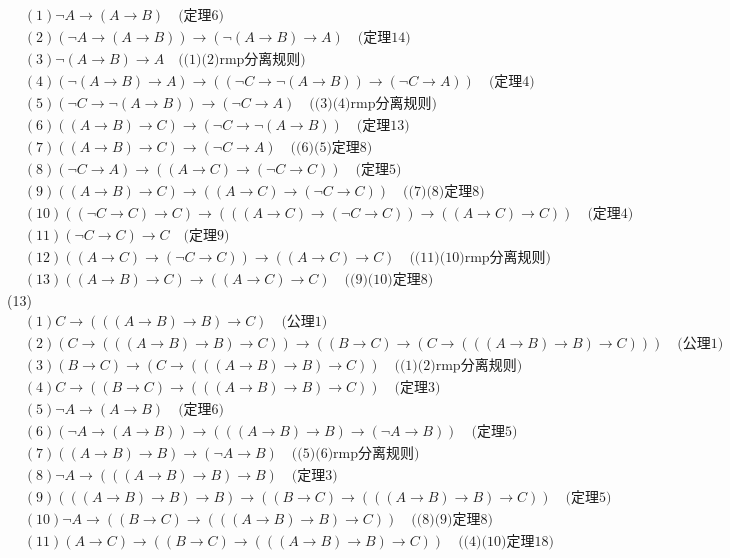 \documentclass{article}
\begin{document}
\[
\begin{aligned}
&(1)\neg A \to (A \to B) \quad \mbox{(定理6)}\\
&(2)(\neg A \to (A \to B)) \to (\neg (A \to B) \to A) \quad \mbox{(定理14)} \\
&(3)\neg (A \to B) \to A \quad \mbox{((1)(2)rmp分离规则)}\\
&(4)(\neg (A \to B) \to A) \to ((\neg C \to \neg (A \to B)) \to (\neg C \to A)) \quad \mbox{(定理4)}\\
&(5)(\neg C \to \neg (A \to B)) \to (\neg C \to A) \quad \mbox{((3)(4)rmp分离规则)} \\
&(6)((A \to B) \to C) \to (\neg C \to \neg (A \to B)) \quad \mbox{(定理13)} \\
&(7)((A \to B) \to C) \to (\neg C \to A) \quad \mbox{((6)(5)定理8)} \\
&(8)(\neg C \to A) \to ((A \to C) \to (\neg C \to C)) \quad \mbox{(定理5)} \\
&(9)((A \to B) \to C) \to ((A \to C) \to (\neg C \to C)) \quad \mbox{((7)(8)定理8)} \\
&(10)((\neg C \to C) \to C) \to (((A \to C) \to (\neg C \to C)) \to ((A \to C) \to C)) \quad \mbox{(定理4)} \\
&(11)(\neg C \to C) \to C \quad \mbox{(定理9)} \\
&(12)((A \to C) \to (\neg C \to C)) \to ((A \to C) \to C) \quad \mbox{((11)(10)rmp分离规则)}\\
&(13)((A \to B) \to C) \to ((A \to C) \to C) \quad \mbox{((9)(10)定理8)}
\end{aligned}
\]
(13)
\[
\begin{aligned}
&(1)C \to (((A \to B) \to B) \to C) \quad \mbox{(公理1)}\\
&(2)(C \to (((A \to B) \to B) \to C)) \to ((B \to C) \to (C \to (((A \to B) \to B) \to C)))\quad \mbox{(公理1)} \\
&(3)(B \to C) \to (C \to (((A \to B) \to B) \to C)) \quad \mbox{((1)(2)rmp分离规则)}\\
&(4)C \to ((B \to C) \to (((A \to B) \to B) \to C)) \quad \mbox{(定理3)}\\
&(5)\neg A \to (A \to B) \quad \mbox{(定理6)} \\
&(6)(\neg A \to (A \to B)) \to (((A \to B) \to B) \to (\neg A \to B))\quad \mbox{(定理5)} \\
&(7)((A \to B) \to B) \to (\neg A \to B) \quad \mbox{((5)(6)rmp分离规则)} \\
&(8)\neg A \to (((A \to B) \to B) \to B) \quad \mbox{(定理3)} \\
&(9)(((A \to B) \to B) \to B) \to ((B \to C) \to (((A \to B) \to B) \to C)) \quad \mbox{(定理5)} \\
&(10)\neg A \to ((B \to C) \to (((A \to B) \to B) \to C)) \quad \mbox{((8)(9)定理8)} \\
&(11)(A \to C) \to ((B \to C) \to (((A \to B) \to B) \to C)) \quad \mbox{((4)(10)定理18)} \\
\end{aligned}
\]
\end{document}
